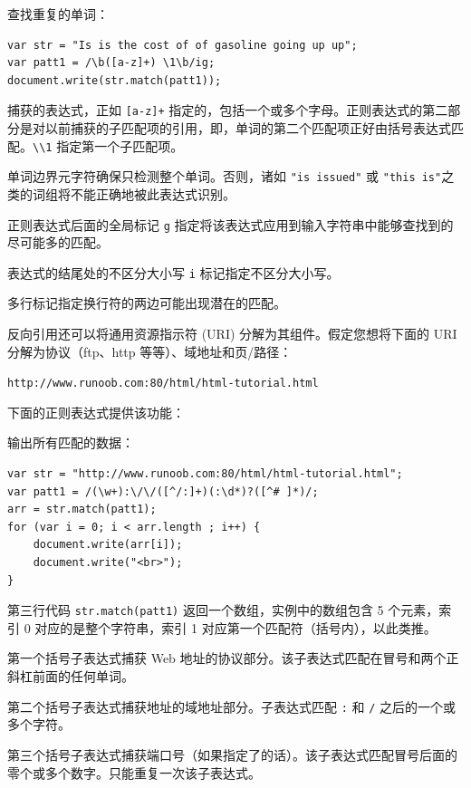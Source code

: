 \documentclass[doctor,openright,twoside]{sjtuthesis}
\newcommand{\passthrough}[1]{#1}
\theoremstyle{plain}
\theoremstyle{definition}
\theoremstyle{remark}
\theoremstyle{ocrenumbox}
\theoremstyle{plain}
\begin{document}
查找重复的单词：

\begin{lstlisting}
var str = "Is is the cost of of gasoline going up up";
var patt1 = /\b([a-z]+) \1\b/ig;
document.write(str.match(patt1));
\end{lstlisting}

捕获的表达式，正如 \passthrough{\lstinline![a-z]+!} 指定的，包括一个或多个字母。正则表达式的第二部分是对以前捕获的子匹配项的引用，即，单词的第二个匹配项正好由括号表达式匹配。\passthrough{\lstinline!\\1!} 指定第一个子匹配项。

单词边界元字符确保只检测整个单词。否则，诸如 \passthrough{\lstinline!"is issued"!} 或 \passthrough{\lstinline!"this is"!}之类的词组将不能正确地被此表达式识别。

正则表达式后面的全局标记 \passthrough{\lstinline!g!} 指定将该表达式应用到输入字符串中能够查找到的尽可能多的匹配。

表达式的结尾处的不区分大小写 \passthrough{\lstinline!i!} 标记指定不区分大小写。

多行标记指定换行符的两边可能出现潜在的匹配。

反向引用还可以将通用资源指示符 (URI) 分解为其组件。假定您想将下面的 URI 分解为协议（ftp、http 等等）、域地址和页/路径：

\passthrough{\lstinline!http://www.runoob.com:80/html/html-tutorial.html!}

下面的正则表达式提供该功能：

输出所有匹配的数据：

\begin{lstlisting}
var str = "http://www.runoob.com:80/html/html-tutorial.html";
var patt1 = /(\w+):\/\/([^/:]+)(:\d*)?([^# ]*)/;
arr = str.match(patt1);
for (var i = 0; i < arr.length ; i++) {
    document.write(arr[i]);
    document.write("<br>");
}
\end{lstlisting}

第三行代码 \passthrough{\lstinline!str.match(patt1)!} 返回一个数组，实例中的数组包含 5 个元素，索引 0 对应的是整个字符串，索引 1 对应第一个匹配符（括号内），以此类推。

第一个括号子表达式捕获 Web 地址的协议部分。该子表达式匹配在冒号和两个正斜杠前面的任何单词。

第二个括号子表达式捕获地址的域地址部分。子表达式匹配 \passthrough{\lstinline!:!} 和 \passthrough{\lstinline!/!} 之后的一个或多个字符。

第三个括号子表达式捕获端口号（如果指定了的话）。该子表达式匹配冒号后面的零个或多个数字。只能重复一次该子表达式。
\end{document}
